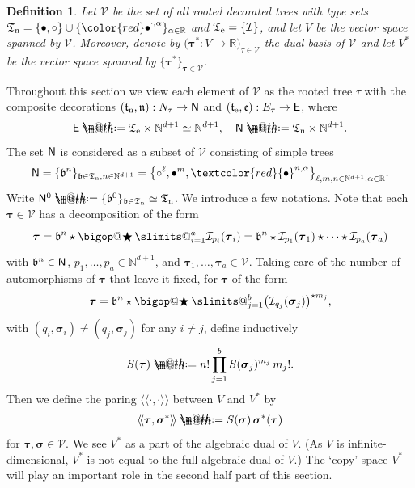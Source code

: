 \documentclass[10pt, reqno]{amsart}
\makeatletter
\numberwithin{subsection}{section}
\numberwithin{subsubsection}{subsection}
\numberwithin{equation}{section} %
\theoremstyle{mystyle}
\theoremstyle{mystyle2}
\newtheorem*{defn*} {Definition}
\theoremstyle{mystyle3}
\DeclareRobustCommand\bigop[1]{%
  \mathop{\vphantom{\sum}\mathpalette\bigop@{#1}}\slimits@
}
\newcommand{\bigop@}[2]{%
  \vcenter{%
    \sbox\z@{$#1\sum$}%
    \hbox{\resizebox{\ifx#1\displaystyle.9\fi\dimexpr\ht\z@+\dp\z@}{!}{$\m@th#2$}}%
  }%
}
\newcommand{\Bigstar}{\DOTSB\bigop{\bigstar}}
\newcommand{\bstau}{\boldsymbol{\tau}}
\newcommand{\bssigma}{\boldsymbol{\sigma}}
\newcommand{\wangle}[1]{\langle\!\langle#1\rangle\!\rangle}
\newcommand\bbN{\mathbb{N}}
\newcommand\bbR{\mathbb{R}}
\newcommand{\mcI}{\mathcal{I}}
\newcommand\mcV{\mathcal V}
\newcommand*{\defeq}{\mathrel{\rlap{%
                     \raisebox{0.3ex}{$\m@th\cdot$}}%
                     \raisebox{-0.3ex}{$\m@th\cdot$}}%
                     =}
\makeatother
\begin{document}
\medskip



\begin{defn*}
Let $\mcV$ be the set of \emph{all} rooted decorated trees with type sets 
$\frak{T}_{\rm n}=\{\bullet,\circ\}\cup\{{\color{red}\bullet}^{\cdot,\alpha}\}_{\alpha\in\bbR}$ and $\frak{T}_{\rm e}=\{\mcI\}$, and let $V$ be the vector space spanned by $\mcV$.
Moreover, denote by $\big(\bstau^*:V\to\bbR\big)_{\tau\in\mcV}$ the dual basis of $\mcV$ and let $V^*$ be the vector space spanned by $\{\bstau^*\}_{\bstau\in\mcV}$.
\end{defn*}

\medskip

Throughout this section we view each element of $\mcV$ as the rooted tree $\tau$ with the composite decorations $(\frak{t}_{\rm n},\frak{n}):N_\tau\to{\sf N}$ and $(\frak{t}_{\rm e},\frak{e}):E_\tau\to{\sf E}$, where
$$
{\sf E}\defeq \frak{T}_{\rm e}\times\bbN^{d+1}\simeq\bbN^{d+1},\quad
{\sf N}\defeq \frak{T}_{\rm n}\times\bbN^{d+1}.
$$
The set ${\sf N}$ is considered as a subset of $\mcV$ consisting of simple trees
$$
{\sf N}=\{\frak{b}^n\}_{\frak{b}\in\frak{T}_{\rm n},n\in\bbN^{d+1}} = \big\{\circ^\ell,\bullet^m,\textcolor{red}{\bullet}^{n,\alpha}\big\}_{\ell,m,n\in\bbN^{d+1}, \alpha\in\bbR}.
$$
Write ${\sf N}^0\defeq \{\frak{b}^0\}_{\frak{b}\in\frak{T}_{\rm n}}\simeq\frak{T}_{\rm n}$. We introduce a few notations. Note that each $\bstau\in\mcV$ has a decomposition of the form
\begin{align}\label{section 6: generic element of U}
\bstau = \frak{b}^n\star\Bigstar_{i=1}^a\mcI_{p_i}(\bstau_i) = \frak{b}^n\star\mcI_{p_1}(\bstau_1)\star\cdots\star\mcI_{p_a}(\bstau_a)
\end{align}
with $\frak{b}^n\in{\sf N}$, $p_1,\dots,p_a\in\bbN^{d+1}$, and $\bstau_1,\dots,\bstau_a\in\mcV$. Taking care of the number of automorphisms of $\bstau$ that leave it fixed, for $\bstau$ of the form 
\begin{align}\label{section 6: generic element of U overlap} 
\bstau=\frak{b}^n\star\Bigstar_{j=1}^b \big(\mcI_{q_j}(\bssigma_j)\big)^{\star m_j},
\end{align}
with $(q_i,\bssigma_i)\neq(q_j,\bssigma_j)$ for any $i\neq j$, define inductively
$$
S(\bstau) \defeq  n!\prod_{j=1}^b S(\bssigma_j)^{m_j}\,m_j!.
$$
Then we define the paring $\wangle{\cdot,\cdot}$ between $V$ and $V^*$ by
\begin{align}\label{Eq normalized pairing}
\wangle{\bstau,\bssigma^*} \defeq  S(\bssigma)\,\bssigma^*(\bstau)
\end{align}
for $\bstau,\bssigma\in\mcV$.    We see $V^*$ as a part of the algebraic dual of $V$. (As $V$ is infinite-dimensional, $V^*$ is not equal to the full algebraic dual of $V$.) The `copy' space $V^*$ will play an important role in the second half part of this section.
\end{document}
